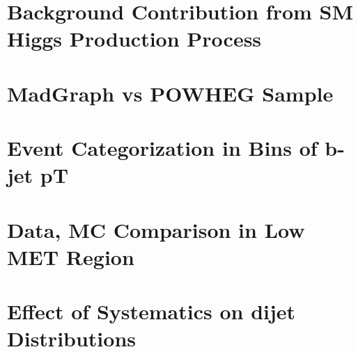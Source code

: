 \documentclass[11pt,twoside,a4paper,an]{cms-tdr}
\begin{document}
\section{Background Contribution from SM Higgs Production Process}

\label{a:appendHiggsBkg}

\section{MadGraph vs POWHEG Sample}

\label{a:appendMGvsPG}

%

\section{Event Categorization in Bins of b-jet pT}

\label{a:appendBjetPtCat}

\section{Data, MC Comparison in Low MET Region}

\label{a:appendLowMET}

\newpage
\section{Effect of Systematics on dijet Distributions}

\label{a:appendSysMjj}

\end{document}
